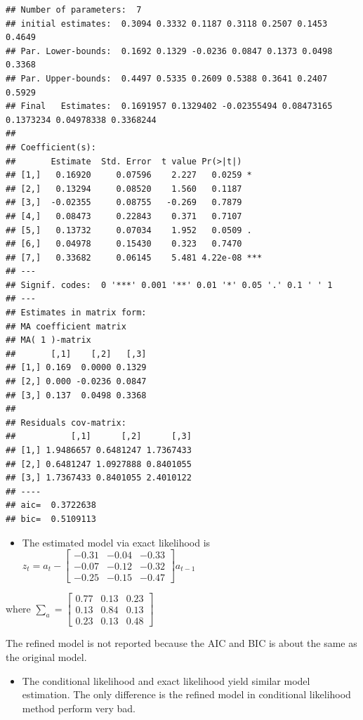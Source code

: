 \documentclass[]{article}
\providecommand{\tightlist}{%
  \setlength{\itemsep}{0pt}\setlength{\parskip}{0pt}}
\begin{document}
\begin{verbatim}
## Number of parameters:  7 
## initial estimates:  0.3094 0.3332 0.1187 0.3118 0.2507 0.1453 0.4649 
## Par. Lower-bounds:  0.1692 0.1329 -0.0236 0.0847 0.1373 0.0498 0.3368 
## Par. Upper-bounds:  0.4497 0.5335 0.2609 0.5388 0.3641 0.2407 0.5929 
## Final   Estimates:  0.1691957 0.1329402 -0.02355494 0.08473165 0.1373234 0.04978338 0.3368244 
## 
## Coefficient(s):
##       Estimate  Std. Error  t value Pr(>|t|)    
## [1,]   0.16920     0.07596    2.227   0.0259 *  
## [2,]   0.13294     0.08520    1.560   0.1187    
## [3,]  -0.02355     0.08755   -0.269   0.7879    
## [4,]   0.08473     0.22843    0.371   0.7107    
## [5,]   0.13732     0.07034    1.952   0.0509 .  
## [6,]   0.04978     0.15430    0.323   0.7470    
## [7,]   0.33682     0.06145    5.481 4.22e-08 ***
## ---
## Signif. codes:  0 '***' 0.001 '**' 0.01 '*' 0.05 '.' 0.1 ' ' 1
## --- 
## Estimates in matrix form: 
## MA coefficient matrix 
## MA( 1 )-matrix 
##       [,1]    [,2]   [,3]
## [1,] 0.169  0.0000 0.1329
## [2,] 0.000 -0.0236 0.0847
## [3,] 0.137  0.0498 0.3368
##   
## Residuals cov-matrix: 
##           [,1]      [,2]      [,3]
## [1,] 1.9486657 0.6481247 1.7367433
## [2,] 0.6481247 1.0927888 0.8401055
## [3,] 1.7367433 0.8401055 2.4010122
## ---- 
## aic=  0.3722638 
## bic=  0.5109113
\end{verbatim}

\begin{itemize}
\tightlist
\item
  The estimated model via exact likelihood is
  \(z_{t} = a_{t} - \left[\begin{array}{rrr}-0.31 & -0.04 & -0.33 \\-0.07 & -0.12 & -0.32 \\-0.25 & -0.15 & -0.47\end{array}\right]a_{t-1}\)
\end{itemize}

where
\(\sum_{a} = \left[\begin{array}{rrr}0.77 & 0.13 & 0.23 \\0.13 & 0.84 & 0.13 \\ 0.23 & 0.13 & 0.48\end{array}\right]\)

The refined model is not reported because the AIC and BIC is about the
same as the original model.

\begin{itemize}
\tightlist
\item
  The conditional likelihood and exact likelihood yield similar model
  estimation. The only difference is the refined model in conditional
  likelihood method perform very bad.
\end{itemize}
\end{document}
